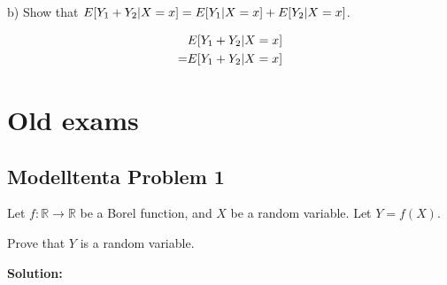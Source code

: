 \documentclass{article}
\begin{document}
b)
Show that
\(E\lbrack Y_1+Y_2|X=x\rbrack=E\lbrack Y_1|X=x\rbrack+E\lbrack Y_2|X=x\rbrack\).

\begin{align*}
     & E\lbrack Y_1+Y_2|X=x\rbrack \\
    =& E\lbrack Y_1+Y_2|X=x\rbrack \\
\end{align*}

\section{Old exams}
\subsection{Modelltenta Problem 1}

Let \(f : \mathbb{R} \to \mathbb{R}\) be a Borel function, and \(X\) be a
random variable. Let \(Y = f(X)\).

Prove that \(Y\) is a random variable.

\textbf{Solution:}
\end{document}
